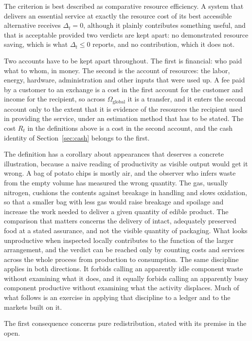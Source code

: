 \documentclass[11pt]{article}
\theoremstyle{remark}
\begin{document}
The criterion is best described as comparative resource efficiency. A system that delivers an essential service at exactly the resource cost of its best accessible alternative receives $\Delta_t=0$, although it plainly contributes something useful, and that is acceptable provided two verdicts are kept apart: no demonstrated resource saving, which is what $\Delta_t\le 0$ reports, and no contribution, which it does not.

Two accounts have to be kept apart throughout. The first is financial: who paid what to whom, in money. The second is the account of resources: the labor, energy, hardware, administration and other inputs that were used up. A fee paid by a customer to an exchange is a cost in the first account for the customer and income for the recipient, so across $\Omega_{\mathrm{global}}$ it is a transfer, and it enters the second account only to the extent that it is evidence of the resources the recipient used in providing the service, under an estimation method that has to be stated. The cost $R_t$ in the definitions above is a cost in the second account, and the cash identity of Section~\ref{sec:cash} belongs to the first.

The definition has a corollary about appearances that deserves a concrete illustration, because a naive reading of productivity as visible output would get it wrong. A bag of potato chips is mostly air, and the observer who infers waste from the empty volume has measured the wrong quantity. The gas, usually nitrogen, cushions the contents against breakage in handling and slows oxidation, so that a smaller bag with less gas would raise breakage and spoilage and increase the work needed to deliver a given quantity of edible product. The comparison that matters concerns the delivery of intact, adequately preserved food at a stated assurance, and not the visible quantity of packaging. What looks unproductive when inspected locally contributes to the function of the larger arrangement, and the verdict can be reached only by counting costs and services across the whole process from production to consumption. The same discipline applies in both directions. It forbids calling an apparently idle component waste without examining what it does, and it equally forbids calling an apparently busy component productive without examining what the activity displaces. Much of what follows is an exercise in applying that discipline to a ledger and to the markets built on it.

The first consequence concerns pure redistribution, stated with its premise in the open.
\end{document}
